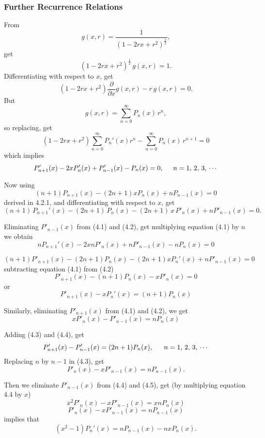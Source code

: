 \documentclass[12pt,a4paper]{report}
\theoremstyle{definition}
\theoremstyle{plain}
\begin{document}
\subsubsection{Further Recurrence Relations}
From $$g(x,r) = \frac{1}{(1 - 2rx + r^2)^{\frac{1}{2}}},$$ get $$(1 - 2rx + r^2)^{\frac{1}{2}}\, g(x,r) = 1.$$ Differentiating with respect to $x$, get 
$$(1 -  2rx + r^2)\frac{\partial}{\partial x}g(x,r) - r\, g(x,r) = 0.$$
But $$g(x,r) = \sum_{n=0}^{\infty} P_n(x)\, r^n,$$ so replacing, get $$(1 - 2rx + r^2)\sum_{n=0}^{\infty} P_n'(x) r^n - \sum_{n=0}^{\infty} P_n(x)\, r^{n+1} = 0$$ which implies 
\begin{equation}
P_{n+1}'(x) - 2xP_n'(x) + P_{n-1}'(x) - P_n(x) = 0, \hspace{0.5cm} n=1,\, 2,\, 3,\, \cdots
\end{equation}



Now using $$(n+1)P_{n+1}(x) - (2n+1)xP_n(x) + n P_{n-1}(x) = 0$$ derived in 4.2.1, and differentiating with respect to $x$, get \begin{equation}
(n+1)\, P_{n+1}'(x) - (2n+1) \, P_n(x) - (2n + 1)\, x\, P'_n(x) + nP'_{n-1}(x) =0.
\end{equation}

Eliminating $P'_{n-1}(x)$ from (4.1) and (4.2), get multiplying equation (4.1) by $n$ we obtain 
$$n P_{n+1}'(x)  - 2x nP'_n(x) + nP'_{n-1}(x) -n P_n(x) =  0$$

$$(n+1) P'_{n+1}(x) - (2n+1)P_n(x) - (2n+1)xP_n'(x) + n P'_{n-1}(x) = 0$$
subtracting equation (4.1) from (4.2)
$$P'_{n+1}(x) - (n+1)P_n(x) - xP'_n(x) = 0$$ or
\begin{equation}
P'_{n+1}(x) - xP_n'(x)  = (n+1)P_n(x)
\end{equation}

Similarly, eliminating $P'_{n+1}(x)$ from (4.1) and (4.2), we get
\begin{equation}
xP'_n(x) - P'_{n-1} (x) = nP_n(x)
\end{equation}

Adding (4.3) and (4.4), get 
$$P'_{n+1}(x) - P'_{n-1}(x) = (2n+1) P_n(x), \, \hspace{0.5cm} n = 1, \, 2,\, 3, \, \cdots$$ 
Replacing $n$ by $n-1$ in (4.3), get
\begin{equation}
P'_n(x) - xP'_{n-1}(x)  = nP_{n-1}(x).
\end{equation}


Then we eliminate $P'_{n-1}(x)$ from (4.4) and (4.5), get (by multiplying equation 4.4 by $x$)
$$x^2P'_n(x) - xP'_{n-1}(x) = xnP_n(x)$$
$$P'_n(x) - x P'_{n-1}(x) = n P_{n-1}(x)$$
implies that 
\begin{equation}
(x^2-1)P_n'(x) = nP_{n-1}(x) - n xP_n(x).
\end{equation}
\end{document}
